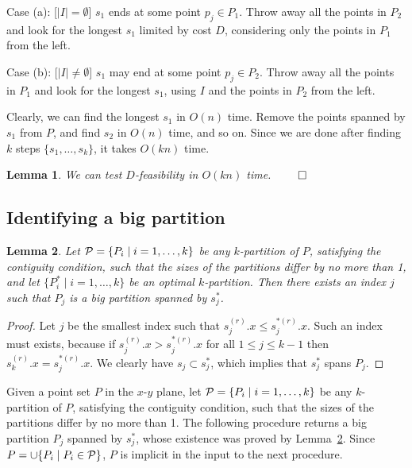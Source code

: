 \documentclass[preprint,10pt]{elsarticle}
\newcommand{\QED}{\hfill$\qed$}
\newtheorem{lemma}{Lemma}
\begin{document}
Case (a): [$|I|=\emptyset$] $s_1$ ends at some point $p_j \in P_1$.
Throw away all the points in $P_2$ and look for the longest $s_1$ limited by cost $D$,
considering only the points in $P_1$ from the left.



Case (b): [$|I|\not=\emptyset$] $s_1$ may end at some point $p_j \in P_2$.
Throw away all the points in $P_1$
and look for the longest $s_1$, using $I$ and the points in $P_2$ from the left.


Clearly,
we can find the longest $s_1$ in $O(n)$ time.
Remove the points spanned by $s_1$ from $P$,
and find $s_2$ in $O(n)$ time, and so on.
Since we are done after finding $k$ steps $\{s_1, \ldots, s_k\}$,
it takes $O(kn)$ time.

\begin{lemma}\label{lem:feasibility}
We can test $D$-feasibility in $O(kn)$ time.
\QED
\end{lemma}

\subsection{Identifying a big partition}\label{sec:findBig}
\begin{lemma}\label{lem:big}
Let ${\cal P}=\{P_i\mid i=1,\ldots,k\}$ be any $k$-partition of $P$,
satisfying the contiguity condition,
such that the sizes of the partitions differ by no more than 1,
and let $\{P^*_i\mid i=1,\ldots,k\}$ be an optimal $k$-partition.
Then there exists an index $j$ such that $P_j$ is a big partition spanned by $s^*_j$.
\end{lemma}
\begin{proof} 
Let $j$ be the smallest index such that $s^{(r)}_j.x \leq s^{*(r)}_j.x$.
Such an index must exists, because if $s^{(r)}_j.x > s^{*(r)}_j.x$
for all $1\leq j \leq k-1$ then $s^{(r)}_k.x = s^{*(r)}_j.x$.
We clearly have $s_j\subset s^*_j$,
which implies that $s^*_j$ spans $P_j$.
\end{proof}

Given a point set $P$ in the $x$-$y$ plane,
let ${\cal P}=\{P_i\mid i=1,\ldots,k\}$ be any $k$-partition of $P$,
satisfying the contiguity condition,
such that the sizes of the partitions differ by no more than 1.
The following procedure returns a big partition $P_j$ spanned by $s^*_j$,
whose existence was proved by Lemma~\ref{lem:big}.
Since $P=\cup\{P_i \mid P_i \in {\cal P}\}$,
$P$ is implicit in the input to the next procedure.
\end{document}
